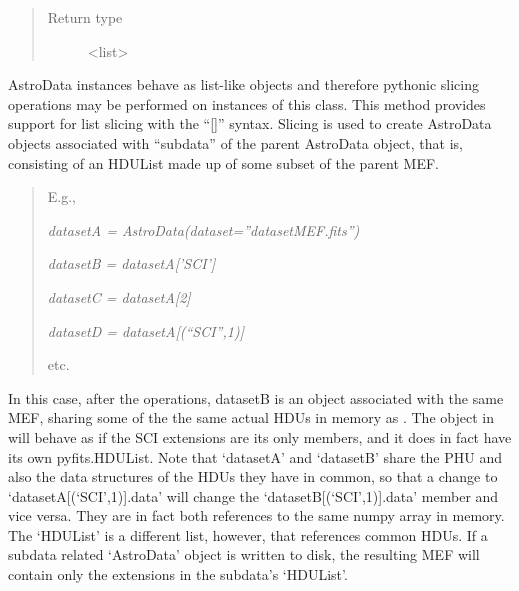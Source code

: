 \documentclass[letterpaper,10pt,english]{sphinxmanual}
\begin{document}
\begin{fulllineitems}
\begin{fulllineitems}
\begin{quote}
\begin{description}
\item[{Return type}] \leavevmode
\textless{}list\textgreater{}

\end{description}\end{quote}

\end{fulllineitems}


\begin{fulllineitems}
\label{astro_class:astrodata.AstroData.__getitem__}
AstroData instances behave as list-like objects and therefore pythonic
slicing operations may be performed on instances of this class.
This method provides support for list slicing with the ``{[}{]}'' syntax.
Slicing is used to create AstroData objects associated with ``subdata'' 
of the parent AstroData object, that is, consisting of
an HDUList made up of some subset of the parent MEF.
\begin{quote}

E.g.,

\emph{datasetA = AstroData(dataset=''datasetMEF.fits'')}

\emph{datasetB = datasetA{[}'SCI'{]}}

\emph{datasetC = datasetA{[}2{]}}

\emph{datasetD = datasetA{[}(``SCI'',1){]}}

etc.
\end{quote}

In this case, after the operations, datasetB is an  object
associated with the same MEF, sharing some of the the same actual HDUs
in memory as . The object in  will behave as if
the SCI extensions are its only members, and it does in fact have its 
own pyfits.HDUList. Note that `datasetA' and `datasetB' share the 
PHU and also the data structures of the HDUs they have in common, so 
that a change to `datasetA{[}(`SCI',1){]}.data' will change the 
`datasetB{[}(`SCI',1){]}.data' member and vice versa. They are in fact both
references to the same numpy array in memory. The `HDUList' is a 
different list, however, that references common HDUs. If a subdata 
related `AstroData' object is written to disk, the resulting MEF will
contain only the extensions in the subdata's `HDUList'.


\end{fulllineitems}
\end{fulllineitems}
\end{document}
